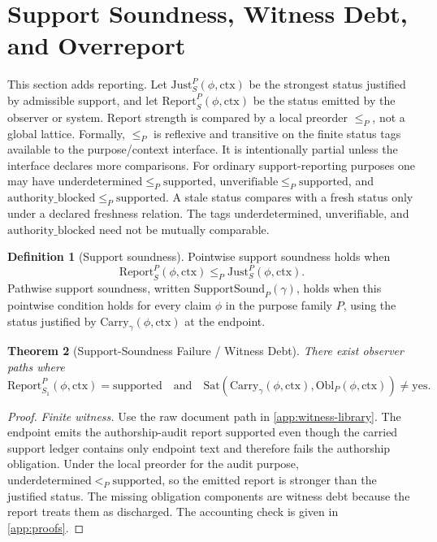\documentclass[11pt,twoside]{article}
\newtheorem{theorem}{Theorem}[section]
\theoremstyle{definition}
\newtheorem{definition}[theorem]{Definition}
\newcommand{\Obl}{\mathrm{Obl}}
\newcommand{\Carry}{\mathrm{Carry}}
\newcommand{\Sat}{\mathrm{Sat}}
\newcommand{\Just}{\mathrm{Just}}
\newcommand{\Report}{\mathrm{Report}}
\newcommand{\ctx}{\mathrm{ctx}}
\newcommand{\supported}{\mathrm{supported}}
\newcommand{\underdetermined}{\mathrm{underdetermined}}
\newcommand{\authorityblocked}{\mathrm{authority\_blocked}}
\newcommand{\unverifiable}{\mathrm{unverifiable}}
\begin{document}
\section{Support Soundness, Witness Debt, and Overreport}
\label{sec:soundness}

This section adds reporting. Let $\Just_S^P(\phi,\ctx)$ be the strongest status
justified by admissible support, and let $\Report_S^P(\phi,\ctx)$ be the status
emitted by the observer or system. Report strength is compared by a local
preorder $\leq_P$, not a global lattice.
Formally, $\leq_P$ is reflexive and transitive on the finite status tags
available to the purpose/context interface. It is intentionally partial unless
the interface declares more comparisons.
For ordinary support-reporting purposes one may have
$\underdetermined\leq_P\supported$,
$\unverifiable\leq_P\supported$, and
$\authorityblocked\leq_P\supported$. A stale status compares with a fresh
status only under a declared freshness relation. The tags
$\underdetermined$, $\unverifiable$, and $\authorityblocked$ need not be
mutually comparable.

\begin{definition}[Support soundness]
\label{def:support-soundness}
Pointwise support soundness holds when
\[
  \Report_S^P(\phi,\ctx)\leq_P \Just_S^P(\phi,\ctx).
\]
Pathwise support soundness, written $\mathrm{SupportSound}_P(\gamma)$, holds
when this pointwise condition holds for every claim $\phi$ in the purpose
family $P$, using the status justified by $\Carry_\gamma(\phi,\ctx)$ at the
endpoint.
\end{definition}

\begin{theorem}[Support-Soundness Failure / Witness Debt]
\label{thm:support-soundness-failure}
There exist observer paths where
\[
  \Report_{S_1}^P(\phi,\ctx)=\supported
  \quad\text{and}\quad
  \Sat(\Carry_\gamma(\phi,\ctx),\Obl_P(\phi,\ctx))\neq \mathrm{yes}.
\]
\end{theorem}

\begin{proof}
\textit{Finite witness.}
Use the raw document path in \cref{app:witness-library}. The endpoint emits the
authorship-audit report $\supported$ even though the carried support ledger
contains only endpoint text and therefore fails the authorship obligation.
Under the local preorder for the audit purpose, $\underdetermined<_P
\supported$, so the emitted report is stronger than the justified status. The
missing obligation components are witness debt because the report treats them
as discharged. The accounting check is given in \cref{app:proofs}.
\end{proof}
\end{document}
